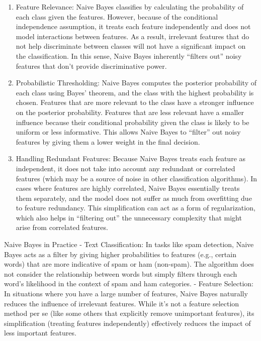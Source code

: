 \documentclass[
  12 pt,
  a4paper,
]{book}
\numberwithin{equation}{section}
\theoremstyle{plain}      %
\theoremstyle{definition} %
\theoremstyle{remark}     %
\theoremstyle{note}         %
\begin{document}
\begin{enumerate}
\def\labelenumi{\arabic{enumi}.}
\item
  Feature Relevance: Naive Bayes classifies by calculating the
  probability of each class given the features. However, because of the
  conditional independence assumption, it treats each feature
  independently and does not model interactions between features. As a
  result, irrelevant features that do not help discriminate between
  classes will not have a significant impact on the classification. In
  this sense, Naive Bayes inherently ``filters out'' noisy features that
  don't provide discriminative power.
\item
  Probabilistic Thresholding: Naive Bayes computes the posterior
  probability of each class using Bayes' theorem, and the class with the
  highest probability is chosen. Features that are more relevant to the
  class have a stronger influence on the posterior probability. Features
  that are less relevant have a smaller influence because their
  conditional probability given the class is likely to be uniform or
  less informative. This allows Naive Bayes to ``filter'' out noisy
  features by giving them a lower weight in the final decision.
\item
  Handling Redundant Features: Because Naive Bayes treats each feature
  as independent, it does not take into account any redundant or
  correlated features (which may be a source of noise in other
  classification algorithms). In cases where features are highly
  correlated, Naive Bayes essentially treats them separately, and the
  model does not suffer as much from overfitting due to feature
  redundancy. This simplification can act as a form of regularization,
  which also helps in ``filtering out'' the unnecessary complexity that
  might arise from correlated features.
\end{enumerate}

\newpage

Naive Bayes in Practice - Text Classification: In tasks like spam
detection, Naive Bayes acts as a filter by giving higher probabilities
to features (e.g., certain words) that are more indicative of spam or
ham (non-spam). The algorithm does not consider the relationship between
words but simply filters through each word's likelihood in the context
of spam and ham categories. - Feature Selection: In situations where you
have a large number of features, Naive Bayes naturally reduces the
influence of irrelevant features. While it's not a feature selection
method per se (like some others that explicitly remove unimportant
features), its simplification (treating features independently)
effectively reduces the impact of less important features.
\end{document}
